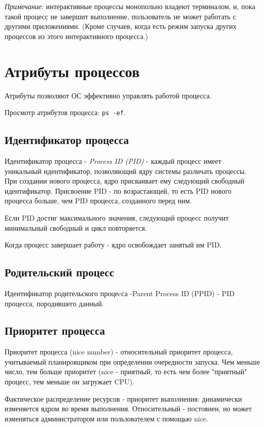 \emph{Примечание}: интерактивные процессы монопольно владеют терминалом, и, пока такой процесс не завершит выполнение, пользователь не может работать с другими приложениями. (Кроме случаев, когда есть режим запуска других процессов из этого интерактивного процесса.)

\section{Атрибуты процессов}

Атрибуты позволяют ОС эффективно управлять работой процесса.

Просмотр атрибутов процесса: \verb+ps -ef+.

\subsection{Идентификатор процесса}
\label{pid}
Идентификатор процесса - \emph{Process ID (PID)} - каждый процесс имеет уникальный идентификатор, позволяющий ядру системы различать процессы.
При создании нового процесса, ядро присваивает ему следующий свободный идентификатор. Присвоение PID - по возрастающей, то есть PID нового процесса больше, чем PID процесса, созданного перед ним. 

Если  PID достиг максимального значения, следующий процесс получит минимальный свободный и цикл повторяется.

Когда процесс завершает работу - ядро освобождает занятый им PID.

\subsection{Родительский процесс}
\label{ppid}
Идентификатор родительского процеcса -Parent Process ID (PPID) -  PID процесса, породившего данный.

\subsection{Приоритет процесса}
Приоритет процесса (nice number) - относительный приоритет процесса, учитываемый планировщиком при определении очередности запуска. Чем меньше число, тем больше приоритет (nice - приятный, то есть чем более "приятный" процесс, тем меньше он загружает CPU).

Фактическое распределение ресурсов - приоритет выполнения: динамически изменяется ядром во время выполнения. Относительный - постоянен, но может изменяться администратором или пользователем с помощью nice.

